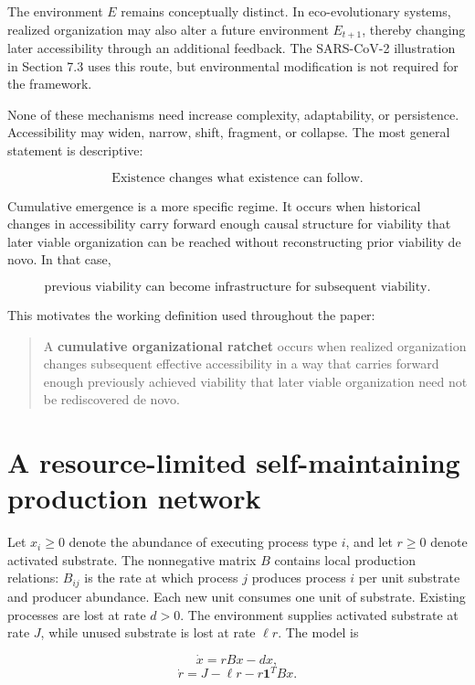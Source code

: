 \documentclass[11pt,a4paper]{article}
\begin{document}
The environment \(E\) remains conceptually distinct. In eco-evolutionary
systems, realized organization may also alter a future environment
\(E_{t+1}\), thereby changing later accessibility through an additional
feedback. The SARS-CoV-2 illustration in Section 7.3 uses this route,
but environmental modification is not required for the framework.

None of these mechanisms need increase complexity, adaptability, or
persistence. Accessibility may widen, narrow, shift, fragment, or
collapse. The most general statement is descriptive:

\[
\boxed{\text{Existence changes what existence can follow.}}
\]

Cumulative emergence is a more specific regime. It occurs when
historical changes in accessibility carry forward enough causal
structure for viability that later viable organization can be reached
without reconstructing prior viability de novo. In that case,

\[
\boxed{\text{previous viability can become infrastructure for subsequent viability}.}
\]

This motivates the working definition used throughout the paper:

\begin{quote}
A \textbf{cumulative organizational ratchet} occurs when realized
organization changes subsequent effective accessibility in a way that
carries forward enough previously achieved viability that later viable
organization need not be rediscovered de novo.
\end{quote}

\section{A resource-limited self-maintaining production
network}\label{a-resource-limited-self-maintaining-production-network}

Let \(x_i \geq 0\) denote the abundance of executing process type \(i\),
and let \(r \geq 0\) denote activated substrate. The nonnegative matrix
\(B\) contains local production relations: \(B_{ij}\) is the rate at
which process \(j\) produces process \(i\) per unit substrate and
producer abundance. Each new unit consumes one unit of substrate.
Existing processes are lost at rate \(d > 0\). The environment supplies
activated substrate at rate \(J\), while unused substrate is lost at
rate \(\ell r\). The model is

\[
\dot{x} = rBx - dx, \tag{5}
\] \[
\dot{r} = J - \ell r - r\mathbf{1}^T Bx. \tag{6}
\]
\end{document}
